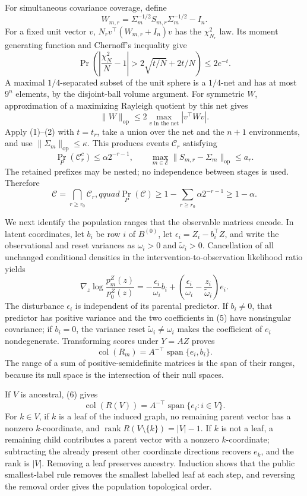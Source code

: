 For simultaneous covariance coverage, define
\[
 W_{m,r}=\Sigma_m^{-1/2}S_{m,r}\Sigma_m^{-1/2}-I_n.
\]
For a fixed unit vector \(v\), \(N_rv^{\top}(W_{m,r}+I_n)v\) has the \(\chi^2_{N_r}\) law.  Its moment generating function and Chernoff's inequality give
\[
 \Pr\!\left(\left|\frac{\chi^2_N}{N}-1\right|>
 2\sqrt{t/N}+2t/N\right)\le2e^{-t}.
 \tag{1}
\]
A maximal \(1/4\)-separated subset of the unit sphere is a \(1/4\)-net and has at most \(9^n\) elements, by the disjoint-ball volume argument.  For symmetric \(W\), approximation of a maximizing Rayleigh quotient by this net gives
\[
 \|W\|_{\mathrm{op}}\le2\max_{v\text{ in the net}}|v^{\top}Wv|.
 \tag{2}
\]
Apply (1)--(2) with \(t=t_r\), take a union over the net and the \(n+1\) environments, and use \(\|\Sigma_m\|_{\mathrm{op}}\le\kappa\).  This produces events \(\mathcal C_r\) satisfying
\[
 \Pr_P(\mathcal C_r^c)\le\alpha2^{-r-1},\qquad
 \max_{m\in\mathcal E}\|S_{m,r}-\Sigma_m\|_{\mathrm{op}}\le a_r.
 \tag{3}
\]
The retained prefixes may be nested; no independence between stages is used.  Therefore
\[
 \mathcal C=\bigcap_{r\ge r_0}\mathcal C_r,qquad
 \Pr_P(\mathcal C)\ge1-
 \sum_{r\ge r_0}\alpha2^{-r-1}\ge1-\alpha.
 \tag{4}
\]

We next identify the population ranges that the observable matrices encode.  In latent coordinates, let \(b_i\) be row \(i\) of \(B^{(0)}\), let \(\epsilon_i=Z_i-b_i^{\top}Z\), and write the observational and reset variances as \(\omega_i>0\) and \(\widetilde\omega_i>0\).  Cancellation of all unchanged conditional densities in the intervention-to-observation likelihood ratio yields
\[
 \nabla_z\log\frac{p_m^Z(z)}{p_0^Z(z)}
 =-\frac{\epsilon_i}{\omega_i}b_i+
 \left(\frac{\epsilon_i}{\omega_i}-\frac{z_i}{\widetilde\omega_i}\right)e_i.
 \tag{5}
\]
The disturbance \(\epsilon_i\) is independent of its parental predictor.  If \(b_i\ne0\), that predictor has positive variance and the two coefficients in (5) have nonsingular covariance; if \(b_i=0\), the variance reset \(\widetilde\omega_i\ne\omega_i\) makes the coefficient of \(e_i\) nondegenerate.  Transforming scores under \(Y=AZ\) proves
\[
 \operatorname{col}(R_m)=A^{-\top}\operatorname{span}\{e_i,b_i\}.
 \tag{6}
\]
The range of a sum of positive-semidefinite matrices is the span of their ranges, because its null space is the intersection of their null spaces.

If \(V\) is ancestral, (6) gives
\[
 \operatorname{col}(R(V))=A^{-\top}\operatorname{span}\{e_i:i\in V\}.
 \tag{7}
\]
For \(k\in V\), if \(k\) is a leaf of the induced graph, no remaining parent vector has a nonzero \(k\)-coordinate, and \(\operatorname{rank}R(V\setminus\{k\})=|V|-1\).  If \(k\) is not a leaf, a remaining child contributes a parent vector with a nonzero \(k\)-coordinate; subtracting the already present other coordinate directions recovers \(e_k\), and the rank is \(|V|\).  Removing a leaf preserves ancestry.  Induction shows that the public smallest-label rule removes the smallest labelled leaf at each step, and reversing the removal order gives the population topological order.

